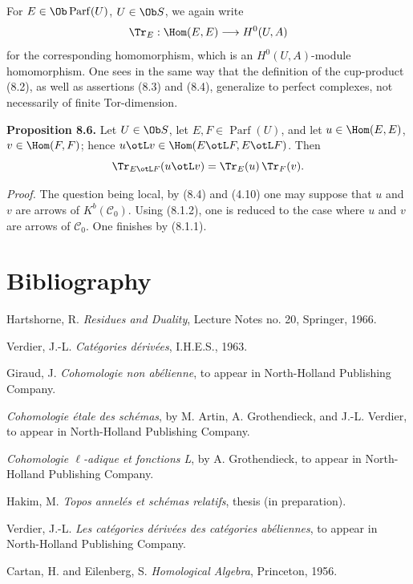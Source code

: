 \documentclass[11pt]{article}
\newcommand{\Parf}{\operatorname{Parf}}
\begin{document}
For \(E\in\Ob\Parf(U)\), \(U\in\Ob S\), we again write
\[
  \Tr_E:\Hom(E,E)\longrightarrow H^0(U,A)
\]
for the corresponding homomorphism, which is an \(H^0(U,A)\)-module homomorphism. One sees in the same way that the definition of the cup-product (8.2), as well as assertions (8.3) and (8.4), generalize to perfect complexes, not necessarily of finite Tor-dimension.

\textbf{Proposition 8.6.} Let \(U\in\Ob S\), let \(E,F\in\Parf(U)\), and let \(u\in\Hom(E,E)\), \(v\in\Hom(F,F)\); hence \(u\otL v\in\Hom(E\otL F,E\otL F)\). Then
\[
  \Tr_{E\otL F}(u\otL v)=\Tr_E(u)\,\Tr_F(v).
\]

\emph{Proof.} The question being local, by (8.4) and (4.10) one may suppose that \(u\) and \(v\) are arrows of \(K^b(\mathcal C_0)\). Using (8.1.2), one is reduced to the case where \(u\) and \(v\) are arrows of \(\mathcal C_0\). One finishes by (8.1.1).

\section*{Bibliography}
\begin{description}[leftmargin=2.5cm,style=nextline]
\item[{[H]}] Hartshorne, R. \emph{Residues and Duality}, Lecture Notes no. 20, Springer, 1966.
\item[{[V]}] Verdier, J.-L. \emph{Catégories dérivées}, I.H.E.S., 1963.
\item[{[G]}] Giraud, J. \emph{Cohomologie non abélienne}, to appear in North-Holland Publishing Company.
\item[{SGA 4}] \emph{Cohomologie étale des schémas}, by M. Artin, A. Grothendieck, and J.-L. Verdier, to appear in North-Holland Publishing Company.
\item[{SGA 5}] \emph{Cohomologie \(\ell\)-adique et fonctions L}, by A. Grothendieck, to appear in North-Holland Publishing Company.
\item[{[1]}] Hakim, M. \emph{Topos annelés et schémas relatifs}, thesis (in preparation).
\item[{[2]}] Verdier, J.-L. \emph{Les catégories dérivées des catégories abéliennes}, to appear in North-Holland Publishing Company.
\item[{[MUL]}] Cartan, H. and Eilenberg, S. \emph{Homological Algebra}, Princeton, 1956.
\end{description}
\end{document}
